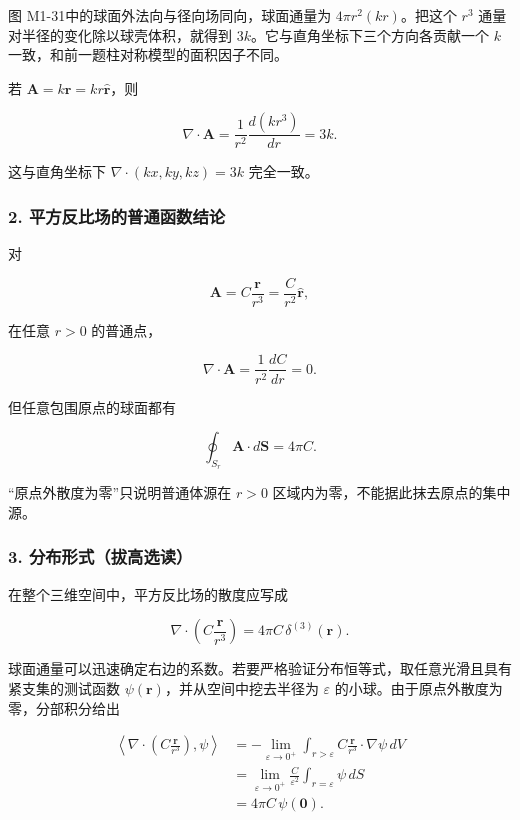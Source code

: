 图 M1-31中的球面外法向与径向场同向，球面通量为 \(4\pi r^2(kr)\)。把这个
\(r^3\) 通量对半径的变化除以球壳体积，就得到
\(3k\)。它与直角坐标下三个方向各贡献一个 \(k\)
一致，和前一题柱对称模型的面积因子不同。

若 \(\mathbf A=k\mathbf r=kr\hat{\mathbf r}\)，则

\[
\nabla\cdot\mathbf A
=\frac1{r^2}\frac{d(kr^3)}{dr}=3k.
\]

这与直角坐标下 \(\nabla\cdot(kx,ky,kz)=3k\) 完全一致。

\subsubsection{2.
平方反比场的普通函数结论}\label{m1:ux5e73ux65b9ux53cdux6bd4ux573aux7684ux666eux901aux51fdux6570ux7ed3ux8bba}

对

\[
\mathbf A=C\frac{\mathbf r}{r^3}
=\frac C{r^2}\hat{\mathbf r},
\]

在任意 \(r>0\) 的普通点，

\[
\nabla\cdot\mathbf A
=\frac1{r^2}\frac{dC}{dr}=0.
\]

但任意包围原点的球面都有

\[
\oint_{S_r}\mathbf A\cdot d\mathbf S
=4\pi C.
\]

``原点外散度为零''只说明普通体源在 \(r>0\)
区域内为零，不能据此抹去原点的集中源。

\subsubsection{3.
分布形式（拔高选读）}\label{m1:ux5206ux5e03ux5f62ux5f0fux62d4ux9ad8ux9009ux8bfb}

在整个三维空间中，平方反比场的散度应写成

\[
\boxed{
\nabla\cdot\left(C\frac{\mathbf r}{r^3}\right)
=4\pi C\,\delta^{(3)}(\mathbf r)
}.
\]

球面通量可以迅速确定右边的系数。若要严格验证分布恒等式，取任意光滑且具有紧支集的测试函数
\(\psi(\mathbf r)\)，并从空间中挖去半径为 \(\varepsilon\)
的小球。由于原点外散度为零，分部积分给出

\[
\begin{aligned}
\left\langle
\nabla\cdot\left(C\frac{\mathbf r}{r^3}\right),\psi
\right\rangle
&=-\lim_{\varepsilon\to0^+}
\int_{r>\varepsilon}
C\frac{\mathbf r}{r^3}\cdot\nabla\psi\,dV\\
&=\lim_{\varepsilon\to0^+}
\frac C{\varepsilon^2}
\int_{r=\varepsilon}\psi\,dS\\
&=4\pi C\,\psi(\mathbf0).
\end{aligned}
\]

